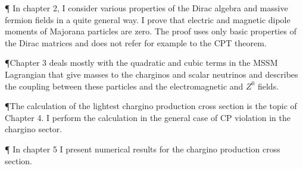 \P
In chapter 2, I consider various properties of the Dirac algebra
and massive fermion fields in a quite general way. 
I prove that electric and magnetic dipole moments
of Majorana particles are zero. The proof uses only basic properties of 
the Dirac matrices and does not refer for example to the CPT theorem.  

\P Chapter 3 deals mostly with the quadratic and cubic terms 
in the MSSM Lagrangian that give masses to the charginos and scalar neutrinos 
and describes the coupling between these particles and the electromagnetic and 
$Z^0$ fields.  

\P The calculation of the lightest chargino production cross section is the 
topic of Chapter 4. I perform the calculation in the general case of
CP violation in the chargino sector.

\P
In chapter 5 I present numerical results for the chargino production 
cross section.







